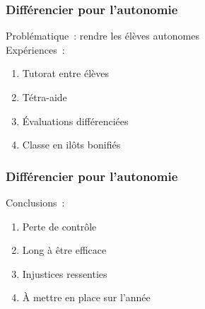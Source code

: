 
\begin{frame}
    \frametitle{Différencier pour l'autonomie}
    Problématique : rendre les élèves autonomes\\
    Expériences :
    \begin{enumerate}
        \item Tutorat entre élèves
        \item Tétra-aide
        \item Évaluations différenciées
        \item Classe en ilôts bonifiés
    \end{enumerate}
\end{frame}

\begin{frame}
    \frametitle{Différencier pour l'autonomie}
    Conclusions :
    \begin{enumerate}
        \item Perte de contrôle
        \item Long à être efficace
        \item Injustices ressenties
        \item À mettre en place sur l'année
    \end{enumerate}
\end{frame}
